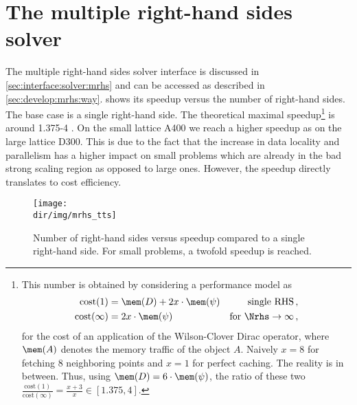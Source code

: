 \section{The multiple right-hand sides solver}
\label{sec:perf:solver:mrhs}

The multiple right-hand sides solver interface is discussed in \cref{sec:interface:solver:mrhs} and can be accessed as described in \cref{sec:develop:mrhs:way}.
 shows its speedup versus the number of right-hand sides.%
The base case is a single right-hand side.
The theoretical maximal speedup\footnote{
This number is obtained by considering a performance model as
\begin{align}
\text{cost}(1)      &= \mem(D) + 2 x \cdot \mem(\psi)    &\text{single RHS} \,, \\
\text{cost}(\infty) &= 2 x \cdot \mem(\psi)              &\text{for } \Nrhs \to \infty  \,,
\end{align}
for the cost of an application of the Wilson-Clover Dirac operator, where $\mem(A)$ denotes the memory traffic of the object $A$.
Naively $x=8$ for fetching \num{8} neighboring points and $x=1$ for perfect caching.
The reality is in between.
Thus, using $\mem(D) = 6 \cdot \mem(\psi)$, the ratio of these two $\frac{\text{cost}(1)}{\text{cost}(\infty)} = \frac{x+3}{x} \in \left[ 1.375, 4 \right]$.
} is around 1.375-4 .
On the small lattice A400 we reach a higher speedup as on the large lattice D300.
This is due to the fact that the increase in data locality and parallelism has a higher impact on small problems which are already in the bad strong scaling region as opposed to large ones.
However, the speedup directly translates to cost efficiency.
\begin{figure}
    \centering
    \texttt{[image: \\dir/img/mrhs\_tts]}
    \caption{Number of right-hand sides versus speedup compared to a single right-hand side. For small problems, a twofold speedup is reached. }
    \label{fig:mrhs:tts}
\end{figure}

